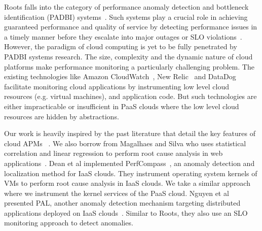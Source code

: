 Roots falls into the category of performance anomaly detection and bottleneck identification 
(PADBI) systems~\cite{Ibidunmoye:2015:PAD:2808687.2791120}. 
Such systems play a crucial role in achieving guaranteed performance and
quality of service by detecting performance issues in a timely manner before they escalate into major outages
or SLO violations~\cite{6045942}. 
However, the paradigm of cloud computing is yet to be
fully penetrated by PADBI systems research. The size, complexity and the dynamic nature of 
cloud platforms make performance monitoring a particularly challenging problem.
The existing technologies like Amazon CloudWatch~\cite{cloudwatch},
New Relic~\cite{newrelic} and DataDog~\cite{datadog} facilitate monitoring cloud applications 
by instrumenting low level cloud resources (e.g. virtual machines), and application code. But such technologies
are either impracticable or insufficient in
PaaS clouds where the low level cloud resources are hidden by abstractions.

Our work is heavily inspired by the past literature that detail the key features of 
cloud APMs~\cite{DaCunhaRodrigues:2016:MCC:2851613.2851619,Ibidunmoye:2015:PAD:2808687.2791120} . 
We also borrow from
Magalhaes and Silva who uses statistical correlation and linear regression to perform
root cause analysis in web applications~\cite{Magalhaes:2010:DPA:1906485.1906774, Magalhaes:2011:RAP:1982185.1982234}. 
Dean et al implemented PerfCompass~\cite{Dean:2014:PTR:2696535.2696551}, 
an anomaly detection and localization method for IaaS clouds. They instrument operating system kernels
of VMs to perform root cause analysis in IaaS clouds. We take a similar approach where we instrument
the kernel services of the PaaS cloud.
Nguyen et al presented PAL, another anomaly detection mechanism targeting
distributed applications deployed on IaaS clouds~\cite{Nguyen:2011:PPR:2038633.2038634}. 
Similar to Roots, they also use an SLO monitoring approach to detect anomalies.